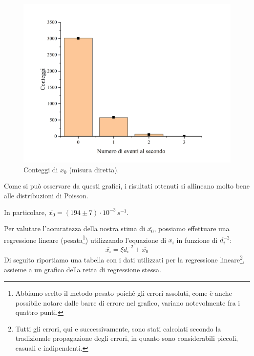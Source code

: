 \documentclass{article}
\begin{document}
\begin{center}
\begin{figure}[H]
    \end{figure}\begin{figure}[H]
        \centering
        \includegraphics[trim={2cm .5cm 2.4cm 2.1cm},clip,width=.5\textwidth]{img/Geiger0.jpg}
        \caption*{Conteggi di $x_0$ (misura diretta).}
    \end{figure}
\end{center}

Come si può osservare da questi grafici, i risultati ottenuti si allineano molto bene
alle distribuzioni di Poisson.

In particolare, $\overline{x_0} = \left(194\pm7\right)\cdot10^{-3}\,\unit{s^{-1}}$.

Per valutare l'accuratezza della nostra stima di $\overline{x_0}$, possiamo effettuare
una regressione lineare (pesata\footnote{
    Abbiamo scelto il metodo pesato poiché gli errori assoluti,
    come è anche possibile notare dalle barre di errore nel grafico,
    variano notevolmente fra i quattro punti.
}) utilizzando l'equazione di $x_i$ in funzione di
$d_i^{-2}$: \[\overline{x_i} = \xi d_i^{-2} + \overline{x_0}\]
Di seguito riportiamo una tabella con i dati utilizzati per la regressione lineare\footnote{
    Tutti gli errori, qui e successivamente, sono stati calcolati secondo la tradizionale
    propagazione degli errori, in quanto sono considerabili piccoli, casuali e indipendenti.
}, assieme a un grafico della retta di regressione stessa.
\end{document}
